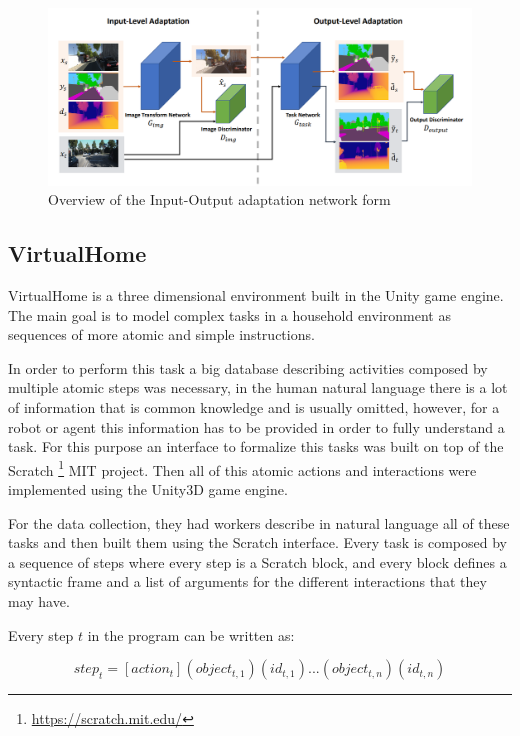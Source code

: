 \begin{itemize}
	\begin{figure}
		\centering
		\includegraphics[width=\linewidth]{archivos/gan}
		\caption{Overview of the Input-Output adaptation network form \cite{DBLP:journals/corr/abs-1812-05040}}
		\label{fig:gan}
	\end{figure}
 
\end{itemize}

\subsection{VirtualHome}
VirtualHome is a three dimensional environment built in the Unity game engine. The main goal is to model complex tasks in a household environment as sequences of more atomic and simple instructions.
 
In order to perform this task a big database describing activities composed by multiple atomic steps was necessary, in the human natural language there is a lot of information that is common knowledge and is usually omitted, however, for a robot or agent this information has to be provided in order to fully understand a task. For this purpose an interface to formalize this tasks was built on top of the Scratch \footnote{\url{https://scratch.mit.edu/}} MIT project. Then all of this atomic actions and interactions were implemented using the Unity3D game engine.

For the data collection, they had workers describe in natural language all of these tasks and then built them using the Scratch interface. Every task is composed by a sequence of steps where every step is a Scratch block, and every block defines a syntactic frame and a list of arguments for the different interactions that they may have.

Every step $t$ in the program can be written as:

\[ step_t = [action_t] (object_{t,1})(id_{t,1}) ... (object_{t,n})(id_{t,n}) \]

